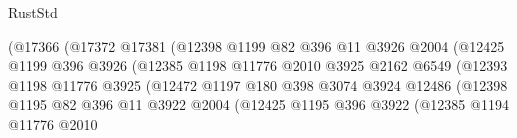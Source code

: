 \begin{lexlean}{RustStd}
\begin{coremodule}
                                      (@17366
                                        (@17372
                                          @17381
                                          (@12398
                                            @1199
                                            @82
                                            @396
                                            @11
                                            @3926
                                            @2004
                                            (@12425
                                              @1199
                                              @396
                                              @3926
                                              (@12385
                                                @1198
                                                @11776
                                                @2010
                                                @3925
                                                @2162
                                                @6549
                                                (@12393
                                                  @1198
                                                  @11776
                                                  @3925
                                                  (@12472
                                                    @1197
                                                    @180
                                                    @398
                                                    @3074
                                                    @3924
                                                    @12486
                                                    (@12398
                                                      @1195
                                                      @82
                                                      @396
                                                      @11
                                                      @3922
                                                      @2004
                                                      (@12425
                                                        @1195
                                                        @396
                                                        @3922
                                                        (@12385
                                                          @1194
                                                          @11776
                                                          @2010

\end{coremodule}
\end{lexlean}
